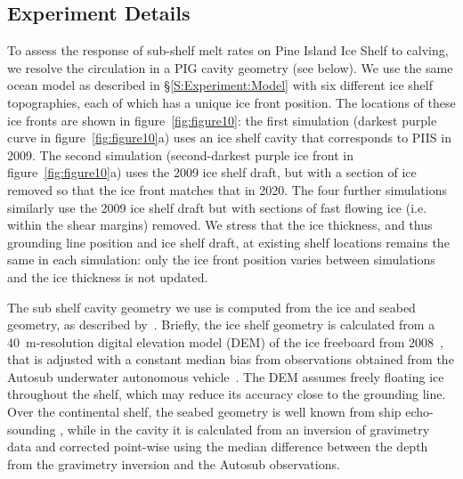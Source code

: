 \documentclass[draft]{agujournal2019}
\begin{document}
\subsection{Experiment Details}
To assess the response of sub-shelf melt rates on Pine Island Ice Shelf to calving, we resolve the circulation in a PIG cavity geometry (see below). We use the same ocean model as described in \S\ref{S:Experiment:Model} with six different ice shelf topographies, each of which has a unique ice front position. The locations of these ice fronts are shown in figure~\ref{fig:figure10}: the first simulation (darkest purple curve in figure~\ref{fig:figure10}a) uses an ice shelf cavity that corresponds to PIIS in 2009. The second simulation (second-darkest purple ice front in figure~\ref{fig:figure10}a) uses the 2009 ice shelf draft, but with a section of ice removed so that the ice front matches that in 2020. The four further simulations similarly use the 2009 ice shelf draft but with sections of fast flowing ice (i.e. within the shear margins) removed. We stress that the ice thickness, and thus grounding line position and ice shelf draft, at existing shelf locations remains the same in each simulation: only the ice front position varies between simulations and the ice thickness is not updated.  %

The sub shelf cavity geometry we use is computed from the ice and seabed geometry, as described by~. Briefly, the ice shelf geometry is calculated from a 40~m-resolution digital elevation model (DEM) of the ice freeboard from 2008~\cite{Korona2009Photogrammetry}, that is adjusted with a constant median bias from observations obtained from the Autosub underwater autonomous vehicle~\cite{Jenkins2010NatureGeo}. The DEM assumes freely floating ice throughout the shelf, which may reduce its accuracy close to the grounding line. Over the continental shelf, the seabed geometry is well known from ship echo-sounding \cite{Dutrieux2014Science}, while in the cavity it is calculated from an inversion of gravimetry data and corrected point-wise using the median difference between the depth from the gravimetry inversion and the Autosub observations. 
\end{document}
